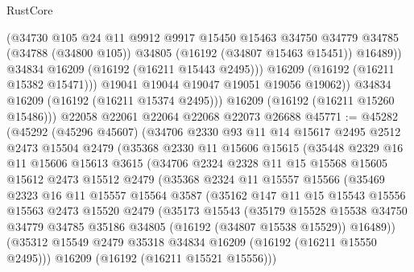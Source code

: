 \begin{lexlean}{RustCore}
\begin{coremodule}
                  (@34730
                    @105
                    @24
                    @11
                    @9912
                    @9917
                    @15450
                    @15463
                    @34750
                    @34779
                    @34785
                    (@34788 (@34800 @105))
                    @34805
                    (@16192 (@34807 @15463 @15451))
                    @16489))
                @34834
                @16209
                (@16192 (@16211 @15443 @2495)))
              @16209
              (@16192 (@16211 @15382 @15471)))
            @19041
            @19044
            @19047
            @19051
            @19056
            @19062))
        @34834
        @16209
        (@16192 (@16211 @15374 @2495)))
      @16209
      (@16192 (@16211 @15260 @15486)))
    @22058
    @22061
    @22064
    @22068
    @22073
    @26688
@45771 := @45282
    (@45292
      (@45296 @45607)
      (@34706
        @2330
        @93
        @11
        @14
        @15617
        @2495
        @2512
        @2473
        @15504
        @2479
        (@35368
          @2330
          @11
          @15606
          @15615
          (@35448
            @2329
            @16
            @11
            @15606
            @15613
            @3615
            (@34706
              @2324
              @2328
              @11
              @15
              @15568
              @15605
              @15612
              @2473
              @15512
              @2479
              (@35368
                @2324
                @11
                @15557
                @15566
                (@35469
                  @2323
                  @16
                  @11
                  @15557
                  @15564
                  @3587
                  (@35162
                    @147
                    @11
                    @15
                    @15543
                    @15556
                    @15563
                    @2473
                    @15520
                    @2479
                    (@35173
                      @15543
                      (@35179
                        @15528
                        @15538
                        @34750
                        @34779
                        @34785
                        @35186
                        @34805
                        (@16192 (@34807 @15538 @15529))
                        @16489))
                    (@35312 @15549 @2479 @35318 @34834 @16209 (@16192 (@16211 @15550 @2495)))
                    @16209
                    (@16192 (@16211 @15521 @15556)))

\end{coremodule}
\end{lexlean}
